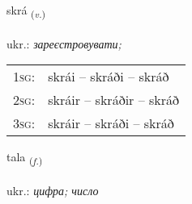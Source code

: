 \documentclass[frontgrid, backgrid]{flacards}\usepackage[]{graphicx}\usepackage[]{xcolor}
\begin{document}
\renewcommand{\blhead}{\vskip5pt {\small\bfseries\footnotesize Sagnorð | дієслово }}
\renewcommand{\bcfoot}{\vskip5pt \hspace{2pt}{\small\bfseries\footnotesize 1K}}


{skrá \small{\textsubscript{(\textit{v.})}} \\[1ex] %
\textphonetic{[skrauː]} \\
ukr.: \emph{зареєстровувати;} \\  [2ex]
\renewcommand*{\arraystretch}{0.8}
\begin{tabular}{p{1cm}l}
\textsc{1sg}: & skrái -- skráði -- skráð \\ 
\textsc{2sg}: & skráir -- skráðir -- skráð \\ 
\textsc{3sg}: & skráir -- skráði -- skráð \\ 
\end{tabular}
}

\renewcommand{\flhead}{\vskip5pt \fboxsep=0pt {\small\bfseries\footnotesize Nafnorð | іменник}}
\renewcommand{\fcfoot}{\vskip5pt \fboxsep=0pt \hspace{2pt}{\small\bfseries\footnotesize 1K}}

\renewcommand{\blhead}{\vskip5pt {\small\bfseries\footnotesize Nafnorð | іменник }}
\renewcommand{\bcfoot}{\vskip5pt \hspace{2pt}{\small\bfseries\footnotesize 1K}}


{tala \small{\textsubscript{(\textit{f.})}} \\[1ex] %
\textphonetic{[tʰaːla]} \\
ukr.: \emph{цифра; число} \\  [2ex]
\renewcommand*{\arraystretch}{0.8}
}

\renewcommand{\flhead}{\vskip5pt \fboxsep=0pt {\small\bfseries\footnotesize Lýsingarorð | прикметник}}
\renewcommand{\fcfoot}{\vskip5pt \fboxsep=0pt \hspace{2pt}{\small\bfseries\footnotesize 1K}}
\end{document}
